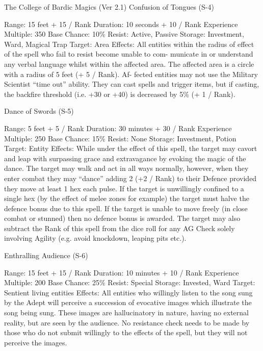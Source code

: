 \begin{Chapter}{The College of Bardic Magics (Ver 2.1)}
Confusion of Tongues (S-4) 

Range: 15 feet + 15 / Rank 
Duration: 10 seconds + 10 / Rank 
Experience Multiple: 350 
Base Chance: 10\% 
Resist: Active, Passive 
Storage: Investment, Ward, Magical Trap 
Target: Area 
Effects:  All  entities  within  the  radius  of  effect  of 
the spell  who fail to  resist become unable to com-
municate  in  or  understand  any  verbal  language 
whilst within the affected area. The affected area is 
a  circle  with  a  radius  of  5  feet  (+  5  /  Rank).  Af-
fected  entities  may  not  use  the  Military  Scientist 
“time out” ability. They can cast spells and trigger 
items,  but  if  casting,  the  backfire  threshold  (i.e. 
+30 or +40) is decreased by 5\% (+ 1 / Rank). 

Dance of Swords (S-5) 

Range: 5 feet + 5 / Rank 
Duration: 30 minutes + 30 / Rank 
Experience Multiple: 250 
Base Chance: 15\% 
Resist: None 
Storage: Investment, Potion 
Target: Entity 
Effects:  While  under  the  effect  of  this  spell,  the 
target  may  cavort  and  leap  with  surpassing  grace 
and  extravagance  by  evoking  the  magic  of  the 
dance.  The  target  may  walk  and  act  in  all  ways 
normally,  however,  when  they  enter  combat  they 
may “dance” adding 2 (+2 / Rank) to their Defence 
provided they move at least 1 hex each pulse. If the 
target  is  unwillingly  confined  to  a  single  hex  (by 
the  effect  of  melee  zones  for  example)  the  target 
must  halve  the  defence  bonus  due  to  this  spell.  If 
the target is unable to move freely (in close combat 
or stunned) then no defence bonus is awarded. The 
target may also subtract the Rank of this spell from 
the  dice  roll  for  any  AG  Check  solely  involving 
Agility (e.g. avoid knockdown, leaping pits etc.). 

Enthralling Audience (S-6) 

Range: 15 feet + 15 / Rank 
Duration: 10 minutes + 10 / Rank 
Experience Multiple: 200 
Base Chance: 25\% 
Resist: Special 
Storage: Invested, Ward 
Target: Sentient living entities 
Effects: All entities who willingly listen to the song 
sung  by  the  Adept  will  perceive  a  succession  of 
evocative  images  which  illustrate  the  song  being 
sung.  These  images  are  hallucinatory  in  nature, 
having  no  external  reality,  but  are  seen  by  the 
audience. No resistance check needs to be made by 
those who do not submit willingly to the effects of 
the  spell,  but  they  will  not  perceive  the  images. 


\end{Chapter}
